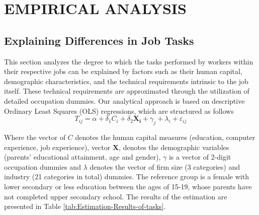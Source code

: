 \section{EMPIRICAL ANALYSIS}

\subsection{Explaining Differences in Job Tasks}

\begin{onehalfspace}
This section analyzes the degree to which the tasks performed by workers
within their respective jobs can be explained by factors such as their
human capital, demographic characteristics, and the technical requirements
intrinsic to the job itself. These technical requirements are approximated
through the utilization of detailed occupation dummies. Our analytical
approach is based on descriptive Ordinary Least Squares (OLS) regressions,
which are structured as follows
\begin{equation}
T_{ij}=\alpha+\delta_{1}C_{i}+\delta_{2}\mathbf{X_{i}}+\gamma_{j}+\lambda_{i}+\varepsilon_{ij}\label{eq:descriptive_ols}
\end{equation}

Where the vector of $C$ denotes the human capital measures (education,
computer experience, job experience), vector $\mathbf{X}$, denotes
the demographic variables (parents' educational attainment, age and
gender), $\gamma$ is a vector of 2-digit occupation dummies and $\lambda$
denotes the vector of firm size (3 categories) and industry (21 categories
in total) dummies. The reference group is a female with lower secondary
or less education between the ages of 15-19, whose parents have not
completed upper secondary school. The results of the estimation are
presented in Table \ref{tab:Estimation-Results-of-tasks}.


\end{onehalfspace}
